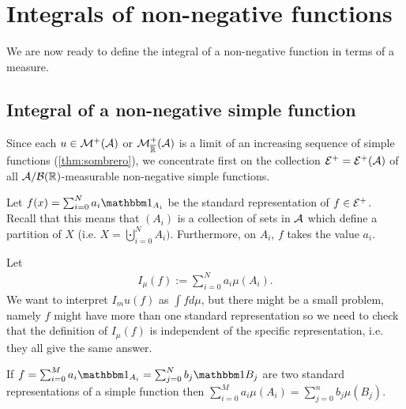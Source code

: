 
\chapter{Integrals of non-negative functions}

We are now ready to define the integral of a non-negative function in terms of a measure.

\section{Integral of a non-negative simple function}

Since each $u \in \mathcal{M}^+(\mathcal{A})$ or $\mathcal{M}^+_{\overline{\mathbb{R}}}(\mathcal{A})$ is a limit of an increasing sequence of simple functions (\autoref{thm:sombrero}), we concentrate first on the collection $\mathcal{E}^+ = \mathcal{E}^+(\mathcal{A})$ of all $\mathcal{A}/\mathcal{B}(\mathbb{R})$-measurable non-negative simple functions.

Let $f(x) = \sum_{i = 0}^N a_i \ind_{A_i}$ be the standard representation of $f \in \mathcal{E}^+$. Recall that this means that $(A_i)$ is a collection of sets in $\mathcal{A}$ which define a partition of $X$ (i.e. $X = \bigcupdot_{i = 0}^N A_i)$. Furthermore, on $A_i$, $f$ takes the value $a_i$.

Let
\begin{align}
	I_\mu(f) := \sum_{i = 0}^N a_i \mu(A_i).
\end{align}
We want to interpret $I_mu(f)$ as $\int f d\mu$, but there might be a small problem, namely $f$ might have more than one standard representation so we need to check that the definition of $I_\mu(f)$ is independent of the specific representation, i.e. they all give the same answer.

\begin{lem}
	If $f = \sum_{i = 0}^M a_i \ind_{A_i} = \sum_{j = 0}^N b_j \ind{B_j}$ are two standard representations of a simple function then $\sum_{i = 0}^M a_i\mu(A_i) = \sum_{j = 0}^n b_j \mu(B_j)$.
\end{lem}

